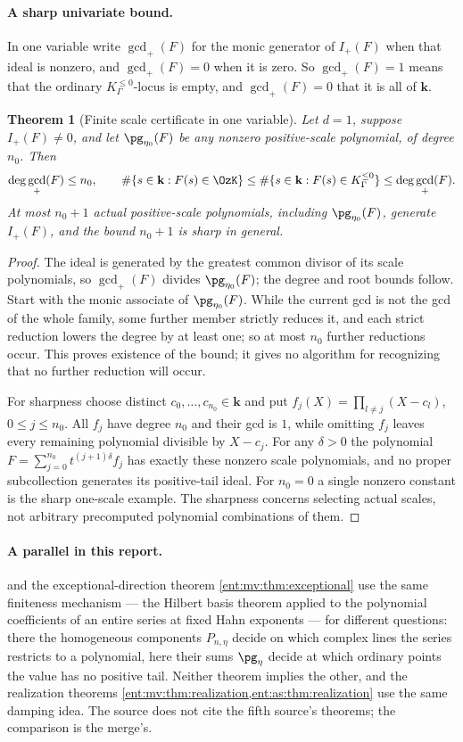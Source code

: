 \documentclass[11pt]{article}
\newtheorem{theorem}{Theorem}[section]
\theoremstyle{plain}
\theoremstyle{plain}
\theoremstyle{plain}
\theoremstyle{definition}
\theoremstyle{definition}
\theoremstyle{definition}
\theoremstyle{definition}
\theoremstyle{remark}
\newcommand{\kk}{\mathbf k}\newcommand{\PP}{\mathbb P}
\newcommand{\Kle}{K_\Gamma^{\le0}}\DeclareMathOperator{\Jac}{Jac}
\begin{document}
\paragraph{A sharp univariate bound.} In one variable write $\gcd_+(F)$ for the
monic generator of $I_+(F)$ when that ideal is nonzero, and $\gcd_+(F)=0$ when
it is zero. So $\gcd_+(F)=1$ means that the ordinary $\Kle$-locus is empty, and
$\gcd_+(F)=0$ that it is all of $\kk$.

\begin{theorem}[Finite scale certificate in one variable]
\label{ent:as:thm:sharp}
Let $d=1$, suppose $I_+(F)\ne0$, and let $\pg_{\eta_0}(F)$ be any nonzero
positive-scale polynomial, of degree $n_0$. Then
\[
 \deg\gcd_+(F)\le n_0,\qquad
 \#\{s\in\kk:F(s)\in\OzK\}\le\#\{s\in\kk:F(s)\in\Kle\}\le\deg\gcd_+(F).
\]
At most $n_0+1$ actual positive-scale polynomials, including
$\pg_{\eta_0}(F)$, generate $I_+(F)$, and the bound $n_0+1$ is sharp in general.
\end{theorem}
\begin{proof}
The ideal is generated by the greatest common divisor of its scale
polynomials, so $\gcd_+(F)$ divides $\pg_{\eta_0}(F)$; the degree and root
bounds follow. Start with the monic associate of $\pg_{\eta_0}(F)$. While the
current gcd is not the gcd of the whole family, some further member strictly
reduces it, and each strict reduction lowers the degree by at least one; so at
most $n_0$ further reductions occur. This proves existence of the bound; it
gives no algorithm for recognizing that no further reduction will occur.

For sharpness choose distinct $c_0,\ldots,c_{n_0}\in\kk$ and put
$f_j(X)=\prod_{l\ne j}(X-c_l)$, $0\le j\le n_0$. All $f_j$ have degree $n_0$ and
their gcd is $1$, while omitting $f_j$ leaves every remaining polynomial
divisible by $X-c_j$. For any $\delta>0$ the polynomial
$F=\sum_{j=0}^{n_0}t^{(j+1)\delta}f_j$ has exactly these nonzero scale
polynomials, and no proper subcollection generates its positive-tail ideal.
For $n_0=0$ a single nonzero constant is the sharp one-scale example. The
sharpness concerns selecting actual scales, not arbitrary precomputed
polynomial combinations of them.
\end{proof}

\paragraph{A parallel in this report.}  and the
exceptional-direction theorem \cref{ent:mv:thm:exceptional} use the same
finiteness mechanism --- the Hilbert basis theorem applied to the polynomial
coefficients of an entire series at fixed Hahn exponents --- for different
questions: there the homogeneous components $P_{n,\eta}$ decide on which
complex lines the series restricts to a polynomial, here their sums $\pg_\eta$
decide at which ordinary points the value has no positive tail. Neither theorem
implies the other, and the realization theorems
\cref{ent:mv:thm:realization,ent:as:thm:realization} use the same damping idea.
The source does not cite the fifth source's theorems; the comparison is the
merge's.
\end{document}

